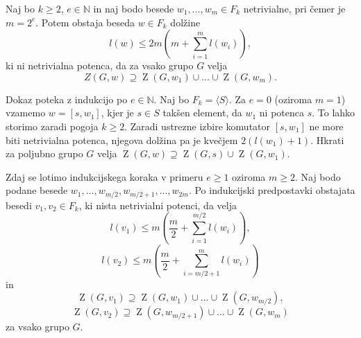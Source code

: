 \documentclass[mat1, tisk]{fmfdelo}
\begin{document}
\begin{lema}
    \label{lem_komutatorska_lema}
     Naj bo $k \ge 2$, $e \in  \mathbb{N}$ in naj bodo besede $w_1, \ldots, w_m \in F_k$ netrivialne, pri čemer je $m = 2^{e}$. Potem obstaja beseda $w \in F_k$
     dolžine \begin{equation*}
     l(w) \le 2m \left(m + \sum_{i=1}^{m} l(w_{i}) \right),
     \end{equation*}  
    ki ni netrivialna potenca, da za vsako grupo $G$ velja \begin{equation*}
    Z(G, w) \supseteq \operatorname{Z}(G, w_1) \cup \ldots \cup \operatorname{Z}(G, w_m).
    \end{equation*}       
    \end{lema}
    \begin{dokaz}
        Dokaz poteka z indukcijo po $e \in  \mathbb{N}$. Naj bo $F_k = \langle S \rangle$.  Za $e = 0$ (oziroma $m = 1$) vzamemo $w = [s, w_1]$, kjer je $s \in S$ takšen element, da $w_1$ ni potenca $s$. To lahko storimo zaradi pogoja $k \ge 2$. Zaradi ustrezne izbire komutator $[s, w_1]$ ne more biti netrivialna potenca, njegova dolžina pa je kvečjem $2(l(w_1)  + 1)$.
        Hkrati za poljubno grupo $G$ velja $\operatorname{Z}(G, w) \supseteq \operatorname{Z}(G, s) \cup \operatorname{Z}(G, w_1)$.
        
        Zdaj se lotimo indukcijskega koraka v primeru $e \ge 1$ oziroma $m \ge 2$. Naj bodo podane besede $w_1, \ldots, w_{m / 2}, w_{m / 2 + 1}, \ldots, w_{2m}$. Po indukcijski predpostavki obstajata besedi $v_1, v_2 \in  F_{k}$, ki nista netrivialni potenci, da velja
        \begin{equation*}
        l(v_1) \le m \left(\frac{m}{2} + \sum_{i=1}^{m / 2} l(w_{i}) \right),
        \end{equation*}  
        \begin{equation*}
            l(v_2) \le m \left(\frac{m}{2} + \sum_{i= m / 2 + 1}^{m} l(w_{i}) \right)
        \end{equation*}  
        in \begin{equation*}
        \operatorname{Z}(G, v_1) \supseteq \operatorname{Z}(G, w_1) \cup \ldots \cup \operatorname{Z}(G, w_{m / 2}),
        \end{equation*}  
        \begin{equation*}
            \operatorname{Z}(G, v_2) \supseteq \operatorname{Z}(G, w_{m / 2 + 1}) \cup \ldots \cup \operatorname{Z}(G, w_{m})
        \end{equation*}  
        za vsako grupo $G$.


\end{dokaz}
\end{document}

